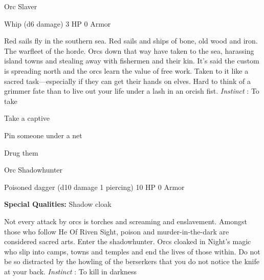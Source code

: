        
\stopitemize
       
\startMonsterName
Orc Slaver	 
\stopMonsterName
       

Whip (d6 damage)	3 HP	0 Armor

       


       
\startMonsterDescription
Red sails fly in the southern sea. Red sails and ships of bone, old wood and iron. The warfleet of the horde. Orcs down that way have taken to the sea, harassing island towns and stealing away with fishermen and their kin. It’s said the custom is spreading north and the orcs learn the value of free work. Taken to it like a sacred task—especially if they can get their hands on elves. Hard to think of a grimmer fate than to live out your life under a lash in an orcish fist. {\em Instinct} : To take
\stopMonsterDescription
       
\startitemize[1,packed]
         
\item Take a captive

         
\item Pin someone under a net

         
\item Drug them

       
\stopitemize
       
\startMonsterName
Orc Shadowhunter	 
\stopMonsterName
       

Poisoned dagger (d10 damage 1 piercing)	10 HP	0 Armor

       


       
\startMonsterQualities
         {\bf Special Qualities:}  Shadow cloak
\stopMonsterQualities
       
\startMonsterDescription
Not every attack by orcs is torches and screaming and enslavement. Amongst those who follow He Of Riven Sight, poison and murder-in-the-dark are considered sacred arts. Enter the shadowhunter. Orcs cloaked in Night’s magic who slip into camps, towns and temples and end the lives of those within. Do not be so distracted by the howling of the berserkers that you do not notice the knife at your back. {\em Instinct} : To kill in darkness
\stopMonsterDescription
       
\startitemize[1,packed]
         
